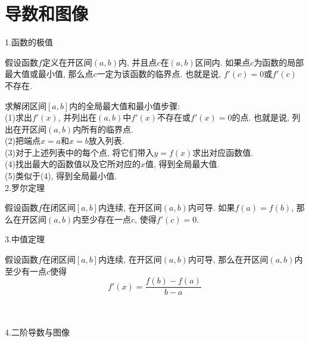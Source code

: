 \chapter{导数和图像}
1.函数的极值
\begin{theorem}[极值定理]
假设函数$f$定义在开区间$(a,b)$内, 并且点$c$在$(a,b)$区间内. 如果点$c$为函数的局部最大值或最小值, 那么点$c$一定为该函数的临界点. 也就是说, $f'(c)=0$或$f'(c)$不存在.
\end{theorem}

求解闭区间$[a,b]$内的全局最大值和最小值步骤:\\
(1)求出$f'(x)$, 并列出在$(a,b)$中$f'(x)$不存在或$f'(x)=0$的点. 也就是说, 列出在开区间$(a,b)$内所有的临界点.\\
(2)把端点$x=a$和$x=b$放入列表.\\
(3)对于上述列表中的每个点, 将它们带入$y=f(x)$求出对应函数值.\\
(4)找出最大的函数值以及它所对应的$x$值, 得到全局最大值.\\
(5)类似于(4), 得到全局最小值.\\[2ex]

2.罗尔定理
\begin{theorem}[罗尔定理]
假设函数$f$在闭区间$[a,b]$内连续, 在开区间$(a,b)$内可导. 如果$f(a)=f(b)$, 那么在开区间$(a,b)$内至少存在一点$c$, 使得$f'(c)=0$.
\end{theorem}\vspace{4ex}

3.中值定理
\begin{theorem}[中值定理]
假设函数$f$在闭区间$[a,b]$内连续, 在开区间$(a,b)$内可导, 那么在开区间$(a,b)$内至少有一点$c$使得
\[f'(x)=\frac{f(b)-f(a)}{b-a}\]
\end{theorem}
\\[2ex]
\\[4ex]

4.二阶导数与图像\\[2ex]
\\[2ex]
\\[2ex]

